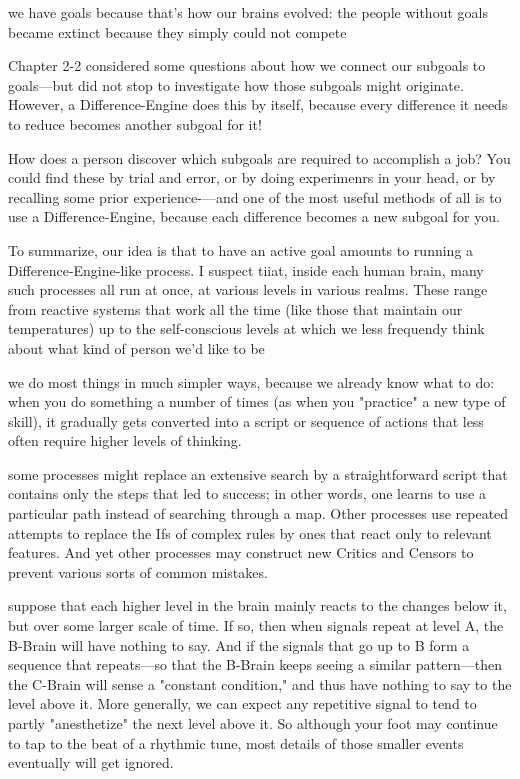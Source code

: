 \documentclass[10pt,a4paper]{article}
\begin{document}
we have goals because that's how our brains evolved: the people without goals became extinct because they simply could not compete \cite[p.~191]{minsky}

Chapter 2-2 considered some questions about how we connect our subgoals to goals—but did not stop to investigate how those subgoals might originate. However, a Difference-Engine does this by itself, because every difference it needs to reduce becomes another subgoal for it! \cite[p.~192]{minsky}

How does a person discover which subgoals are required to accomplish a job? You could find these by trial and error, or by doing experimenrs in your head, or by recalling some prior experience-—and one of the most useful methods of all is to use a Difference-Engine, because each difference becomes a new subgoal for you. \cite[p.~194]{minsky}

To summarize, our idea is that to have an active goal amounts to running a Difference-Engine-like process. I suspect tiiat, inside each human brain, many such processes all run at once, at various levels in various realms. These range from reactive systems that work all the time (like those that maintain our temperatures) up to the self-conscious levels at which we less frequendy think about what kind of person we'd like to be \cite[p.~194]{minsky}

we do most things in much simpler ways, because we already know what to do: when you do something a number of times (as when you "practice" a new type of skill), it gradually gets converted into a script or sequence of actions that less often require higher levels of thinking. \cite[p.~194]{minsky}

some processes might replace an extensive search by a straightforward script that contains only the steps that led to success; in other words, one learns to use a particular path instead of searching through a map. Other processes use repeated attempts to replace the Ifs of complex rules by ones that react only to relevant features. And yet other processes may construct new Critics and Censors to prevent various sorts of common mistakes. \cite[p.~195]{minsky}

suppose that each higher level in the brain mainly reacts to the changes below it, but over some larger scale of time. If so, then when signals repeat at level A, the B-Brain will have nothing to say. And if the signals that go up to B form a sequence that repeats—so that the B-Brain keeps seeing a similar pattern—then the C-Brain will sense a "constant condition," and thus have nothing to say to the level above it. More generally, we can expect any repetitive signal to tend to partly "anesthetize" the next level above it. So although your foot may continue to tap to the beat of a rhythmic tune, most details of those smaller events eventually will get ignored. \cite[p.~197-198]{minsky}
\end{document}
